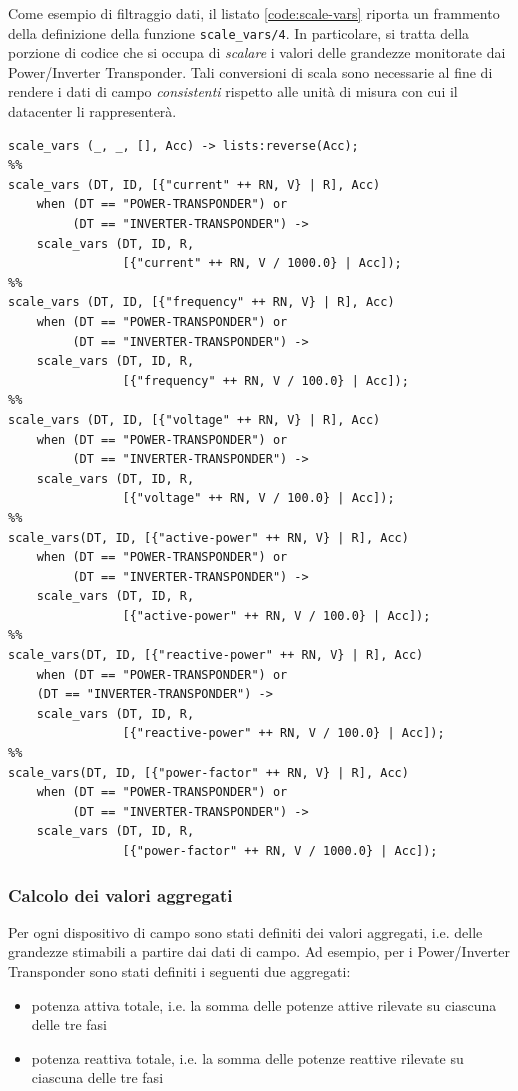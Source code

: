 %
Come esempio di filtraggio dati, il listato \ref{code:scale-vars} riporta un frammento della 
definizione della funzione \texttt{scale\_vars/4}. In particolare, si tratta della porzione di 
codice che si occupa di \emph{scalare} i valori delle grandezze monitorate 
dai Power/Inverter Transponder.
%
Tali conversioni di scala sono necessarie al fine di rendere i dati di campo \emph{consistenti} 
rispetto alle unit\`a di misura con cui il datacenter li rappresenter\`a.
%
\begin{lstlisting}[caption={\emph{Scaling} delle misure del Power Transponder}, label={code:scale-vars},frame=trBL]
scale_vars (_, _, [], Acc) -> lists:reverse(Acc);
%%
scale_vars (DT, ID, [{"current" ++ RN, V} | R], Acc) 
    when (DT == "POWER-TRANSPONDER") or 
         (DT == "INVERTER-TRANSPONDER") ->
    scale_vars (DT, ID, R, 
                [{"current" ++ RN, V / 1000.0} | Acc]);
%%
scale_vars (DT, ID, [{"frequency" ++ RN, V} | R], Acc)
    when (DT == "POWER-TRANSPONDER") or 
         (DT == "INVERTER-TRANSPONDER") ->
    scale_vars (DT, ID, R, 
                [{"frequency" ++ RN, V / 100.0} | Acc]);
%%
scale_vars (DT, ID, [{"voltage" ++ RN, V} | R], Acc)
    when (DT == "POWER-TRANSPONDER") or 
         (DT == "INVERTER-TRANSPONDER") ->
    scale_vars (DT, ID, R, 
                [{"voltage" ++ RN, V / 100.0} | Acc]);
%%
scale_vars(DT, ID, [{"active-power" ++ RN, V} | R], Acc)
    when (DT == "POWER-TRANSPONDER") or 
         (DT == "INVERTER-TRANSPONDER") ->
    scale_vars (DT, ID, R, 
                [{"active-power" ++ RN, V / 100.0} | Acc]);
%%
scale_vars(DT, ID, [{"reactive-power" ++ RN, V} | R], Acc)
    when (DT == "POWER-TRANSPONDER") or 
    (DT == "INVERTER-TRANSPONDER") ->
    scale_vars (DT, ID, R, 
                [{"reactive-power" ++ RN, V / 100.0} | Acc]);
%%
scale_vars(DT, ID, [{"power-factor" ++ RN, V} | R], Acc)
    when (DT == "POWER-TRANSPONDER") or 
         (DT == "INVERTER-TRANSPONDER") ->
    scale_vars (DT, ID, R, 
                [{"power-factor" ++ RN, V / 1000.0} | Acc]);
\end{lstlisting}
%

%
\subsubsection{Calcolo dei valori aggregati}
%
Per ogni dispositivo di campo sono stati definiti dei valori aggregati, i.e. delle 
grandezze stimabili a partire dai dati di campo. 
%
Ad esempio, per i Power/Inverter Transponder sono stati definiti i seguenti due 
aggregati:
%
\begin{itemize}
\item potenza attiva totale, i.e. la somma delle potenze attive rilevate su 
      ciascuna delle tre fasi
\item potenza reattiva totale, i.e. la somma delle potenze reattive rilevate su
      ciascuna delle tre fasi 
\end{itemize}
%

